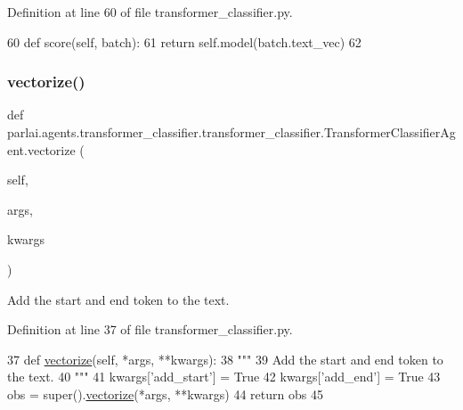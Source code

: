 Definition at line 60 of file transformer\+\_\+classifier.\+py.


\begin{DoxyCode}
60     \textcolor{keyword}{def }score(self, batch):
61         \textcolor{keywordflow}{return} self.model(batch.text\_vec)
62 
\end{DoxyCode}
\mbox{\label{classparlai_1_1agents_1_1transformer__classifier_1_1transformer__classifier_1_1TransformerClassifierAgent_afff32a6e789532e0bf6223b466e43588}} 
\subsubsection{\texorpdfstring{vectorize()}{vectorize()}}
{\footnotesize\ttfamily def parlai.\+agents.\+transformer\+\_\+classifier.\+transformer\+\_\+classifier.\+Transformer\+Classifier\+Agent.\+vectorize (\begin{DoxyParamCaption}\item[{}]{self,  }\item[{}]{args,  }\item[{}]{kwargs }\end{DoxyParamCaption})}

\begin{DoxyVerb}Add the start and end token to the text.
\end{DoxyVerb}
 

Definition at line 37 of file transformer\+\_\+classifier.\+py.


\begin{DoxyCode}
37     \textcolor{keyword}{def }\hyperlink{namespaceparlai_1_1agents_1_1drqa_1_1utils_a5c76cc39e3014c7bcf9199d566dbdc0f}{vectorize}(self, *args, **kwargs):
38         \textcolor{stringliteral}{"""}
39 \textcolor{stringliteral}{        Add the start and end token to the text.}
40 \textcolor{stringliteral}{        """}
41         kwargs[\textcolor{stringliteral}{'add\_start'}] = \textcolor{keyword}{True}
42         kwargs[\textcolor{stringliteral}{'add\_end'}] = \textcolor{keyword}{True}
43         obs = super().\hyperlink{namespaceparlai_1_1agents_1_1drqa_1_1utils_a5c76cc39e3014c7bcf9199d566dbdc0f}{vectorize}(*args, **kwargs)
44         \textcolor{keywordflow}{return} obs
45 
\end{DoxyCode}


